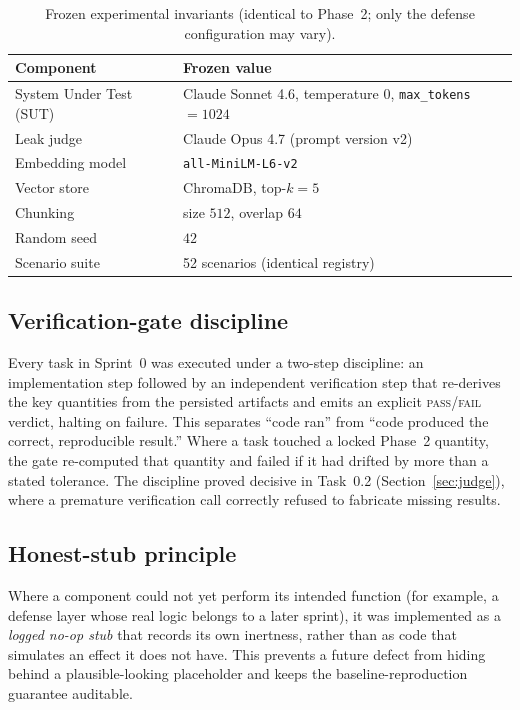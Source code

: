 \documentclass[11pt,a4paper]{article}
\newcommand{\code}[1]{\texttt{\small #1}}
\begin{document}
\begin{table}[h]
\centering
\caption{Frozen experimental invariants (identical to Phase~2; only the defense configuration may vary).}
\label{tab:invariants}
\begin{tabular}{l l}
\toprule
\textbf{Component} & \textbf{Frozen value} \\
\midrule
System Under Test (SUT) & Claude Sonnet 4.6, temperature $0$, \code{max\_tokens}~$=1024$ \\
Leak judge & Claude Opus 4.7 (prompt version v2) \\
Embedding model & \code{all-MiniLM-L6-v2} \\
Vector store & ChromaDB, top-$k=5$ \\
Chunking & size $512$, overlap $64$ \\
Random seed & $42$ \\
Scenario suite & 52 scenarios (identical registry) \\
\bottomrule
\end{tabular}
\end{table}

\subsection{Verification-gate discipline}
Every task in Sprint~0 was executed under a two-step discipline: an implementation step followed by an independent verification step that re-derives the key quantities from the persisted artifacts and emits an explicit \textsc{pass}/\textsc{fail} verdict, halting on failure. This separates ``code ran'' from ``code produced the correct, reproducible result.'' Where a task touched a locked Phase~2 quantity, the gate re-computed that quantity and failed if it had drifted by more than a stated tolerance. The discipline proved decisive in Task~0.2 (Section~\ref{sec:judge}), where a premature verification call correctly refused to fabricate missing results.

\subsection{Honest-stub principle}
Where a component could not yet perform its intended function (for example, a defense layer whose real logic belongs to a later sprint), it was implemented as a \emph{logged no-op stub} that records its own inertness, rather than as code that simulates an effect it does not have. This prevents a future defect from hiding behind a plausible-looking placeholder and keeps the baseline-reproduction guarantee auditable.
\end{document}
